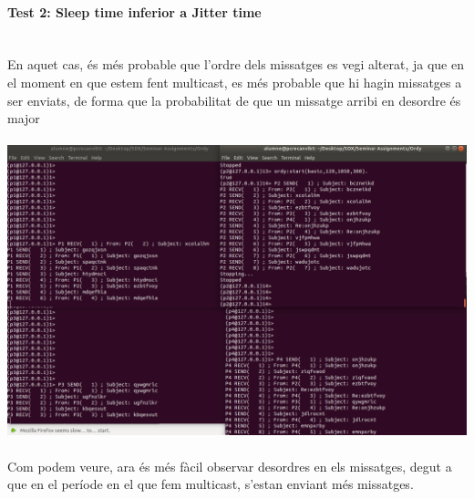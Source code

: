 \documentclass[a4paper, 10pt]{article}
\begin{document}
\begin{enumerate}
\newpage\paragraph[bold]{Test 2: Sleep time inferior a Jitter time\\\\}
En aquet cas, és més probable que l'ordre dels missatges es vegi alterat, ja que en el moment en que estem fent multicast, es més probable que hi hagin missatges a ser enviats, de forma que la probabilitat de que un missatge arribi en desordre és major\\\\
\includegraphics[width=\textwidth]{ordy-basic-2}
\\\\Com podem veure, ara és més fàcil observar desordres en els missatges, degut a que en el període en el que fem multicast, s'estan enviant més missatges.
\end{enumerate}

\newpage
\end{document}
